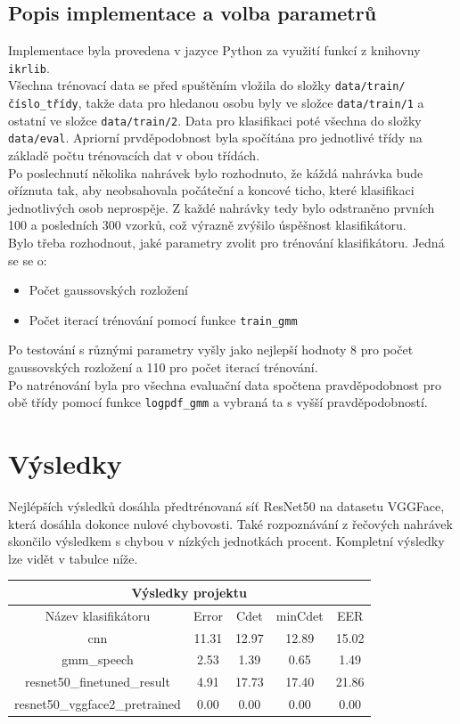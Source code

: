 \documentclass{article}
\begin{document}
\subsection{Popis implementace a volba parametrů}
Implementace byla provedena v jazyce Python za využití funkcí z knihovny \texttt{ikrlib}.\\
Všechna trénovací data se před spuštěním vložila do složky \texttt{data/train/číslo\_třídy}, takže data pro hledanou osobu byly ve složce \texttt{data/train/1} a ostatní ve složce \texttt{data/train/2}. Data pro klasifikaci poté všechna do složky \texttt{data/eval}. Apriorní prvděpodobnost byla spočítána pro jednotlivé třídy na základě počtu trénovacích dat v obou třídách.\\
Po poslechnutí několika nahrávek bylo rozhodnuto, že káždá nahrávka bude oříznuta tak, aby neobsahovala počáteční a koncové ticho, které klasifikaci jednotlivých osob neprospěje. Z každé nahrávky tedy bylo odstraněno prvních 100 a posledních 300 vzorků, což výrazně zvýšilo úspěšnost klasifikátoru.\\
Bylo třeba rozhodnout, jaké parametry zvolit pro trénování klasifikátoru. Jedná se se o:
\begin{itemize}
    \item Počet gaussovských rozložení
    \item Počet iterací trénování pomocí funkce \texttt{train\_gmm}
\end{itemize}

Po testování s různými parametry vyšly jako nejlepší hodnoty 8 pro počet gaussovských rozložení a 110 pro počet iterací trénování.\\
Po natrénování byla pro všechna evaluační data spočtena pravděpodobnost pro obě třídy pomocí funkce \texttt{logpdf\_gmm} a vybraná ta s vyšší pravděpodobností.


\section{Výsledky}

Nejlépších výsledků dosáhla předtrénovaná síť ResNet50 na datasetu VGGFace, která dosáhla dokonce nulové chybovosti. Také rozpoznávání z řečových nahrávek skončilo výsledkem s chybou v nízkých jednotkách procent. Kompletní výsledky lze vidět v tabulce níže.\\

\centering
\begin{tabular}{ |c|c|c|c|c|  }
 \hline
 \multicolumn{5}{|c|}{Výsledky projektu} \\
 \hline
 Název klasifikátoru & Error & Cdet &  minCdet & EER \\
 \hline
 cnn   & 11.31 & 12.97 & 12.89 & 15.02\\
 gmm\_speech & 2.53 & 1.39 & 0.65 & 1.49\\
 resnet50\_finetuned\_result & 4.91 & 17.73 & 17.40 & 21.86\\
 resnet50\_vggface2\_pretrained & 0.00 & 0.00 & 0.00 & 0.00\\
 \hline
\end{tabular}

\end{document}
